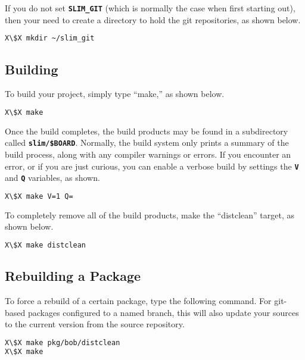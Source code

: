 \documentclass[a4paper,10pt]{article}
\newcommand{\fw}{\tt\bf}
\begin{document}
    If you do not set {\fw SLIM\_GIT} (which is normally the case when
    first starting out), then your need to create a directory to hold
    the git repositories, as shown below.

\begin{lstlisting}[language=bash,escapechar=X]
X\$X mkdir ~/slim_git
\end{lstlisting}

\subsection{Building}

    To build your project, simply type ``make,'' as shown below.

\begin{lstlisting}[language=bash,escapechar=X]
X\$X make
\end{lstlisting}

    Once the build completes, the build products may be found in a
    subdirectory called {\fw slim/\$BOARD}. Normally, the build system
    only prints a summary of the build process, along with any
    compiler warnings or errors. If you encounter an error, or if you
    are just curious, you can enable a verbose build by settings the
    {\fw V} and {\fw Q} variables, as shown.

\begin{lstlisting}[language=bash,escapechar=X]
X\$X make V=1 Q=
\end{lstlisting}

    To completely remove all of the build products, make the
    ``distclean'' target, as shown below.

\begin{lstlisting}[language=bash,escapechar=X]
X\$X make distclean
\end{lstlisting}

\subsection{Rebuilding a Package}

    To force a rebuild of a certain package, type the following
    command. For git-based packages configured to a named branch, this
    will also update your sources to the current version from the
    source repository.

\begin{lstlisting}[language=bash,escapechar=X]
X\$X make pkg/bob/distclean
X\$X make
\end{lstlisting}
\end{document}
